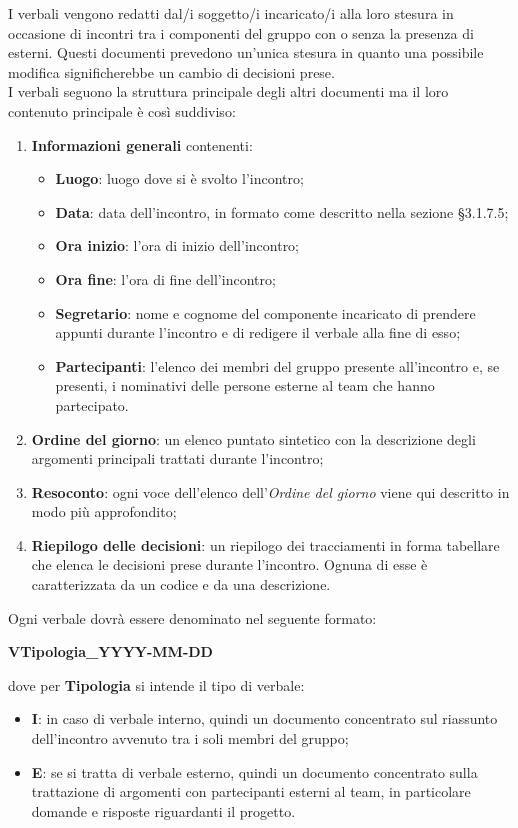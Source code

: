 	
	I verbali vengono redatti dal/i soggetto/i incaricato/i alla loro stesura in occasione di incontri tra i componenti del gruppo con o senza la presenza di esterni.  Questi documenti prevedono un'unica stesura in quanto una possibile modifica significherebbe un cambio di decisioni prese. \\
	I verbali seguono la struttura principale degli altri documenti ma il loro contenuto principale è così suddiviso:
	\begin{enumerate}
		\item \textbf{Informazioni generali} contenenti:
		\begin{itemize}
			\item \textbf{Luogo}: luogo dove si è svolto l'incontro;
			\item \textbf{Data}: data dell'incontro, in formato come descritto nella sezione §3.1.7.5;
			\item \textbf{Ora inizio}: l'ora di inizio dell'incontro;
			\item \textbf{Ora fine}: l'ora di fine dell'incontro;
			\item \textbf{Segretario}: nome e cognome del componente incaricato di prendere appunti durante l'incontro e di redigere il verbale alla fine di esso;
			\item \textbf{Partecipanti}: l'elenco dei membri del gruppo presente all'incontro e, se presenti, i nominativi delle persone esterne al team che hanno partecipato.
		\end{itemize}
		\item \textbf{Ordine del giorno}: un elenco puntato sintetico con la descrizione degli argomenti principali trattati durante l'incontro;
		\item \textbf{Resoconto}: ogni voce dell'elenco dell'\textit{Ordine del giorno} viene qui descritto in modo più approfondito;
		\item \textbf{Riepilogo delle decisioni}: un riepilogo dei tracciamenti in forma tabellare che elenca le decisioni prese durante l'incontro. Ognuna di esse è caratterizzata da un codice e da una descrizione.
	\end{enumerate}
	Ogni verbale dovrà essere denominato nel seguente formato:
	\begin{center}
	\textbf{VTipologia\_YYYY-MM-DD}
	\end{center}
	dove per \textbf{Tipologia} si intende il tipo di verbale:
	\begin{itemize}
		\item \textbf{I}: in caso di verbale interno, quindi un documento concentrato sul riassunto dell'incontro avvenuto tra i soli membri del gruppo;
		\item \textbf{E}: se si tratta di verbale esterno, quindi un documento concentrato sulla trattazione di argomenti con partecipanti esterni al team, in particolare domande e risposte riguardanti il progetto.
	\end{itemize}		
